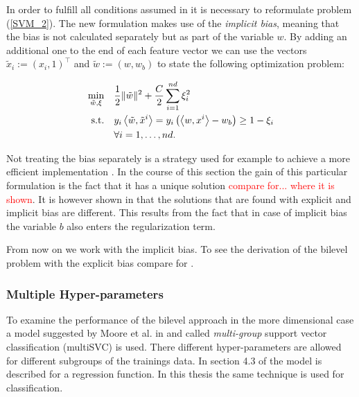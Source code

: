In order to fulfill all conditions assumed in \cite{Outrata1998} it is necessary to reformulate problem (\ref{SVM_2}).
The new formulation makes use of the \emph{implicit bias}, meaning that the bias is not calculated separately but as part of the variable \(w\). 
By adding an additional one to the end of each feature vector we can use the vectors \(\tilde{x}_i := (x_i,1)^{\top}\) and \(\tilde{w} := (w,w_b)\) to state the following optimization problem:

\begin{align}
\begin{split}
	\min_{\tilde{w},\xi} \quad & \frac{1}{2} \|\tilde{w}\|^2+\frac{C}{2}\sum_{i=1}^{nd}{\xi_i^2} \vspace{0.5ex}\\
	\text{s.t.} \quad & y_i\Langle \tilde{w},\tilde{x}^i\Rangle = y_i\left(\Langle w,x^i\Rangle-w_b\right) \geq 1 - \xi_i \vspace{0.5ex}\\
	& 	\forall i = 1, \dots , nd.
\end{split}
\label{SVM_bias}
\end{align}

Not treating the bias separately is a strategy used for example to achieve a more efficient implementation \cite[section 3.2, p. 22]{Gunn1998}. In the course of this section the gain of this particular formulation is the fact that it has a unique solution \textcolor{red}{compare for... where it is shown}.
It is however shown in \cite[section 3.2, p. 22]{Gunn1998} that the solutions that are found with explicit and implicit bias are different.
This results from the fact that in case of implicit bias the variable \(b\) also enters the regularization term.

From now on we work with the implicit bias. To see the derivation of the bilevel problem with the explicit bias compare for \cite[section 2.2]{Kunapuli2008}.

\subsubsection{Multiple Hyper-parameters}

To examine the performance of the bilevel approach in the more dimensional case a model suggested by Moore et al. in \cite{Moore2011} and called \emph{multi-group} support vector classification (multiSVC) is used. There different hyper-parameters are allowed for different subgroups of the trainings data.
In section 4.3 of \cite{Moore2011} the model is described for a regression function. In this thesis the same technique is used for classification.

